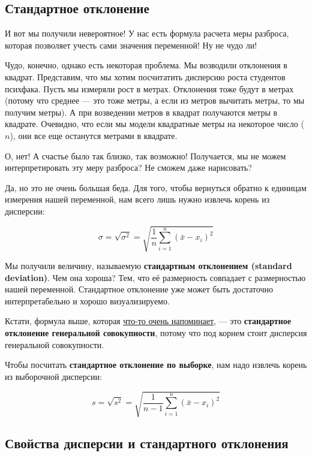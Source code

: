 \documentclass[
  letterpaper,
]{scrbook}
\theoremstyle{definition}
\theoremstyle{remark}
\begin{document}
\subsection{Стандартное
отклонение}\label{andan-descriptives-standard-deviation}

И вот мы получили невероятное! У нас есть формула расчета меры разброса,
которая позволяет учесть сами значения переменной! Ну не чудо ли!

Чудо, конечно, однако есть некоторая проблема. Мы возводили отклонения в
квадрат. Представим, что мы хотим посчитатить дисперсию роста студентов
психфака. Пусть мы измеряли рост в метрах. Отклонения тоже будут в
метрах (потому что среднее --- это тоже метры, а если из метров вычитать
метры, то мы получим метры). А при возведении метров в квадрат
получаются метры в квадрате. Очевидно, что если мы модели квадратные
метры на некоторое число (\(n\)), они все еще останутся метрами в
квадрате.

О, нет! А счастье было так близко, так возможно! Получается, мы не можем
интерпретировать эту меру разброса? Не сможем даже нарисовать?

Да, но это не очень большая беда. Для того, чтобы вернуться обратно к
единицам измерения нашей переменной, нам всего лишь нужно извлечь корень
из дисперсии:

\[
\sigma = \sqrt{\sigma^2} = \sqrt{\frac{1}{n} \sum_{i=1}^n (\bar x - x_i)^2}
\]

Мы получили величину, называемую \textbf{стандартным отклонением
(standard deviation)}. Чем она хороша? Тем, что её размерность совпадает
с размерностью нашей переменной. Стандартное отклонение уже может быть
достаточно интерпретабельно и хорошо визуализируемо.

Кстати, формула выше, которая \hyperref[quadratic_mean]{что-то очень
напоминает}, --- это \textbf{стандартное отклонение генеральной
совокупности}, потому что под корнем стоит дисперсия генеральной
совокупности.

Чтобы посчитать \textbf{стандартное отклонение по выборке}, нам надо
извлечь корень из выборочной дисперсии:

\[
s = \sqrt{s^2} = \sqrt{\frac{1}{n-1} \sum_{i=1}^n (\bar x - x_i)^2}
\]

\subsection{Свойства дисперсии и стандартного
отклонения}\label{andan_descriptives_var_features}
\end{document}
